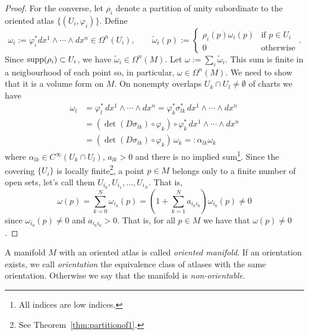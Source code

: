 \begin{proof}
  For the converse, let $\rho_i$ denote a partition of unity subordinate to the oriented atlas $\{(U_i, \varphi_i)\}$.
  Define
  \begin{equation}
    \omega_i := \varphi_i^* dx^1\wedge\cdots\wedge dx^n \in \Omega^n(U_i)
    , \qquad
    \widetilde \omega_i(p) := \begin{cases}
      \rho_i(p)\omega_i(p) & \mbox{if } p\in U_i \\
      0                    & \mbox{otherwise}
    \end{cases}.
  \end{equation}
  Since $\operatorname{supp}(\rho_i) \subset U_i$, we have $\widetilde\omega_i\in\Omega^n(M)$.
  Let $\omega := \sum_i \widetilde \omega_i$. This sum is finite in a neigbourhood of each point so, in particular, $\omega \in \Omega^n(M)$. We need to show that it is a volume form on $M$.
  On nonempty overlaps $U_k \cap U_l \neq \emptyset$ of charts we have
  \begin{align}
    \omega_l & = \varphi_l^*\, dx^1\wedge\cdots\wedge dx^n = \varphi_k^* \sigma_{lk}^*\, dx^1 \wedge\cdots\wedge dx^n \\
             & = (\det(D\sigma_{lk})\circ \varphi_k)\circ \varphi^*_k\, dx^1\wedge\cdots\wedge dx^n                   \\
             & = (\det(D\sigma_{lk})\circ \varphi_k)\, \omega_k =: \alpha_{lk} \omega_k \label{form:cov}
  \end{align}
  where $\alpha_{lk}\in C^{\infty}(U_k\cap U_l)$, $a_{lk} > 0$ and there is no implied sum\footnote{All indices are low indices.}.
  Since the covering $\{U_i\}$ is locally finite\footnote{See Theorem~\ref{thm:partitionof1}.}, a point $p\in M$ belongs only to a finite number of open sets, let's call them $U_{i_0}, U_{i_1}, \ldots, U_{i_N}$. That is,
  \begin{equation}
    \omega(p) = \sum_{k=0}^N \omega_{i_k}(p) = \left( 1 + \sum_{k = 1}^N a_{i_k i_0} \right) \omega_{i_0}(p) \neq 0
  \end{equation}
  since $\omega_{i_0}(p) \neq 0$ and $a_{i_k i_0} > 0$.
  That is, for all $p\in M$ we have that $\omega(p) \neq 0$.
\end{proof}


\begin{definition}
  A manifold $M$ with an oriented atlas is called \emph{oriented manifold}.
  If an orientation exists, we call \emph{orientation} the equivalence class of atlases with the same orientation.
  Otherwise we say that the manifold is \emph{non-orientable}.
\end{definition}

